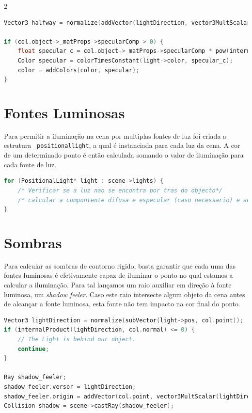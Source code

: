 \documentclass{article}
\begin{document}
\begin{multicols}{2}
\begin{lstlisting}[language=C++]
Vector3 halfway = normalize(addVector(lightDirection, vector3MultScalar(ray.versor, -1)));

if (col.object->_matProps->specularComp > 0) {
    float specular_c = col.object->_matProps->specularComp * pow(internalProduct(col.normal, halfway), col.object->_matProps->shine);
    Color specular = colorTimesConstant(light->color, specular_c);
    color = addColors(color, specular);
}
\end{lstlisting}

    \section{Fontes Luminosas}
    Para permitir a iluminação na cena por multiplas fontes de luz foi criada a estrutura  \verb|_positionallight|, a qual é instanciada para cada luz da cena. A cor de um determinado ponto é então calculada somando o valor de iluminação para cada fonte de luz.
\begin{lstlisting}[language=C++]
for (PositionalLight* light : scene->lights) {
    /* Verificar se a luz nao se encontra por tras do objecto*/
    /* calcular a compontente difusa e especular (caso necessario) e adicionar ao valor da cor*/
}
\end{lstlisting}
    \section{Sombras}

    Para calcular as sombras de contorno rígido, basta garantir que cada uma das fontes
    luminosas é efetivamente capaz de iluminar o ponto no qual estamos a calcular a
    iluminação. Para tal lançamos um raio auxiliar em direção à fonte luminosa, um
    \textit{shadow feeler}. Caso este raio intersecte algum objeto da cena antes de
    alcançar a fonte luminosa, esta fonte não tem impacto na cor final do ponto.

\begin{lstlisting}[language=C++]
Vector3 lightDirection = normalize(subVector(light->pos, col.point));
if (internalProduct(lightDirection, col.normal) <= 0) {
    // The Light is behind our object.
    continue;
}

Ray shadow_feeler;
shadow_feeler.versor = lightDirection;
shadow_feeler.origin = addVector(col.point, vector3MultScalar(lightDirection, EPSILON));
Collision shadow = scene->castRay(shadow_feeler);


\end{lstlisting}
\end{multicols}
\end{document}
